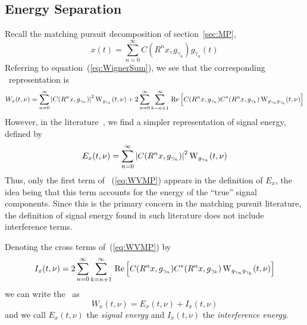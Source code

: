 
\subsection{Energy Separation}%
\label{sec:energy-separation}
Recall the matching pursuit decomposition of section~\ref{sec:MP},
\[%
x(t) = \sum_{n=0}^\infty C(R^nx,g_{\gamma_n})g_{\gamma_n}(t) 
\]%
Referring to equation~(\ref{eq:WignerSum}), we see that the 
corresponding \WV\ representation is
\begin{equation}\label{eq:WVMP}
W_x(t,\nu) = \sum_{n=0}^\infty 
    \left|C(R^nx,g_{\gamma_n})\right|^2 \operatorname{W}_{g_{\gamma_n}}(t,\nu) 
    + 2\sum_{n=0}^{\infty}\sum_{k=n+1}^\infty\,
     \mbox{Re}\left[C(R^nx,g_{\gamma_n}) C^*(R^nx,g_{\gamma_k})
                \operatorname{W}_{g_{\gamma_n}g_{\gamma_k}}(t,\nu)\right] 
\end{equation}
However, in the literature~\cite{Gribonval:1996}, we find a
simpler representation of signal energy, defined by
\begin{equation}\label{eq:MP2}
E_x(t,\nu) = \sum_{n=0}^\infty 
    \left|C(R^nx,g_{\gamma_n})\right|^2 \operatorname{W}_{g_{\gamma_n}}(t,\nu) 
\end{equation}
Thus, only the first term of%
~(\ref{eq:WVMP}) appears in the definition of $E_x$,
the idea being that this term accounts for the energy of the
``true'' signal components.  Since this is the primary concern in
the matching pursuit literature, the definition of signal energy 
found in such literature does not include interference terms.

Denoting the cross terms of~(\ref{eq:WVMP}) by
\[
I_x(t,\nu) = 2\sum_{n=0}^{\infty}\sum_{k=n+1}^\infty\,
     \mbox{Re}\left[C(R^nx,g_{\gamma_n}) C^*(R^nx,g_{\gamma_k})
                \operatorname{W}_{g_{\gamma_n}g_{\gamma_k}}(t,\nu)\right] 
\]
we can write the \WV\ as
\[
W_x(t,\nu)=E_x(t,\nu) +I_x(t,\nu) 
\]
and we call $E_x(t,\nu)$ the \emph{signal energy} and $I_x(t,\nu)$ the
\emph{interference energy.}








